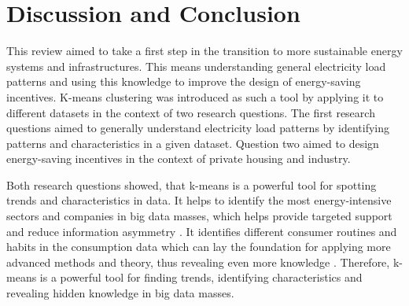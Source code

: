 


\section{Discussion and Conclusion}
\label{cha:discussionAndConclusion}

This review aimed to take a first step in the transition to more sustainable energy systems and infrastructures.
This means understanding general electricity load patterns and using this knowledge to improve the design of energy-saving incentives.
K-means clustering was introduced as such a tool by applying it to different datasets in the context of two research questions.
The first research questions aimed to generally understand electricity load patterns by identifying patterns and characteristics in a given dataset.
Question two aimed to design energy-saving incentives in the context of private housing and industry.

Both research questions showed, that k-means is a powerful tool for spotting trends and characteristics in data.
It helps to identify the most energy-intensive sectors and companies in big data masses, which helps provide targeted support and reduce information asymmetry \cite{LIU-BDE}.
It identifies different consumer routines and habits in the consumption data which can lay the foundation for applying more advanced methods and theory, thus revealing even more knowledge \cite{MAL-HBP}.
Therefore, k-means is a powerful tool for finding trends, identifying characteristics and revealing hidden knowledge in big data masses.

